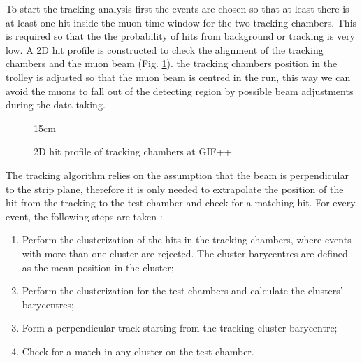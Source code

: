 To start the tracking analysis first the events are chosen so that at least there is at least one hit inside the muon time window for the two tracking chambers. This is required so that the the probability of hits from background or tracking is very low. A 2D hit profile is constructed to check the alignment of the tracking chambers and the muon beam (Fig. \ref{fig:2D_hit_profile}). the tracking chambers position in the trolley is adjusted so that the muon beam is centred in the run, this way we can avoid the muons to fall out of the detecting region by possible beam adjustments during the data taking. 

\begin{figure}[!htm]{15cm} %
\caption{2D hit profile of tracking chambers at GIF++.}%
\label{fig:2D_hit_profile}
\end{figure}

The tracking algorithm relies on the assumption that the beam is perpendicular to the strip plane, therefore it is only needed to extrapolate the position of the hit from the tracking to the test chamber and check for a matching hit. For every event, the following steps are taken \cite{https://doi.org/10.48550/arxiv.2211.16591}:
\begin{enumerate}
    \item Perform the clusterization of the hits in the tracking chambers, where events with more than one cluster are rejected. The cluster barycentres are defined as the mean position in the cluster;
    \item Perform the clusterization for the test chambers and calculate the clusters' barycentres;
    \item Form a perpendicular track starting from the tracking cluster barycentre;
    \item Check for a match in any cluster on the test chamber. 
\end{enumerate}

